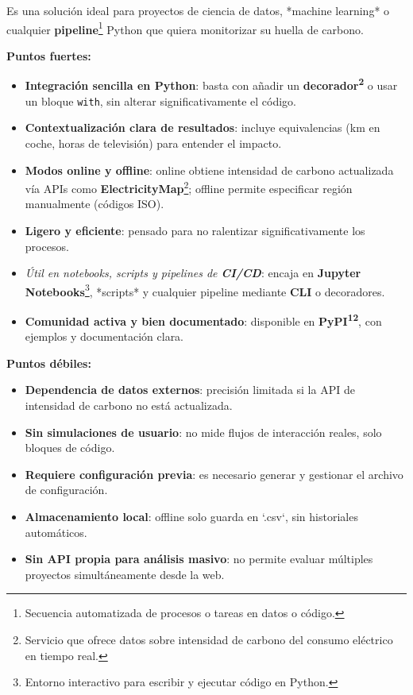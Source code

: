 \documentclass[12pt,a4paper]{report}
\begin{document}
Es una solución ideal para proyectos de ciencia de datos, *machine learning* o
cualquier \textbf{pipeline}\footnote{Secuencia automatizada de procesos o
  tareas en datos o código.} Python que quiera monitorizar su huella de carbono.

\textbf{Puntos fuertes:}
\begin{itemize}
  \item \textbf{Integración sencilla en Python}: basta con añadir un \textbf{decorador\textsuperscript{2}} o usar un bloque \texttt{with}, sin alterar significativamente el código.
  \item \textbf{Contextualización clara de resultados}: incluye equivalencias (km en coche, horas de televisión) para entender el impacto.
  \item \textbf{Modos online y offline}: online obtiene intensidad de carbono actualizada vía APIs como \textbf{ElectricityMap}\footnote{Servicio que ofrece datos sobre intensidad de carbono del consumo eléctrico en tiempo real.}; offline permite especificar región manualmente (códigos ISO).
  \item \textbf{Ligero y eficiente}: pensado para no ralentizar significativamente los procesos.
  \item \textit{Útil en notebooks, scripts y pipelines de \textbf{CI/CD}}: encaja en \textbf{Jupyter Notebooks}\footnote{Entorno interactivo para escribir y ejecutar código en Python.}, *scripts* y cualquier pipeline mediante \textbf{CLI} o decoradores.
  \item \textbf{Comunidad activa y bien documentado}: disponible en \textbf{PyPI\textsuperscript{12}}, con ejemplos y documentación clara.
\end{itemize}

\textbf{Puntos débiles:}
\begin{itemize}
  \item \textbf{Dependencia de datos externos}: precisión limitada si la API de intensidad de carbono no está actualizada.
  \item \textbf{Sin simulaciones de usuario}: no mide flujos de interacción reales, solo bloques de código.
  \item \textbf{Requiere configuración previa}: es necesario generar y gestionar el archivo de configuración.
  \item \textbf{Almacenamiento local}: offline solo guarda en `.csv`, sin historiales automáticos.
  \item \textbf{Sin API propia para análisis masivo}: no permite evaluar múltiples proyectos simultáneamente desde la web.
\end{itemize}
\end{document}
